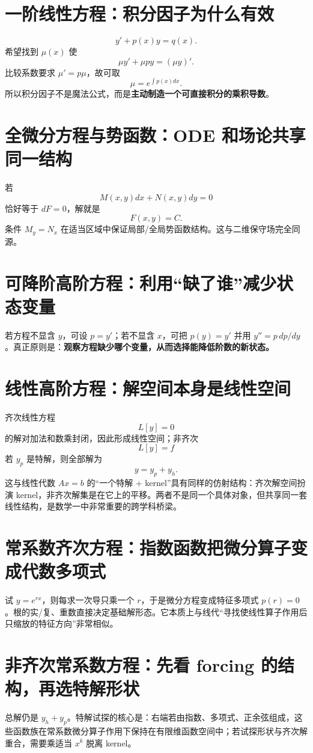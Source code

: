 \documentclass[11pt,a4paper,openany]{ctexbook}
\newcommand{\key}[1]{\textbf{\color{deep}#1}}
\begin{document}
\section{一阶线性方程：积分因子为什么有效}
\[
y'+p(x)y=q(x).
\]
希望找到 $\mu(x)$ 使
\[
\mu y'+\mu py=(\mu y)'.
\]
比较系数要求 $\mu'=p\mu$，故可取
\[
\mu=e^{\int p(x)dx}.
\]
所以积分因子不是魔法公式，而是\key{主动制造一个可直接积分的乘积导数}。

\section{全微分方程与势函数：ODE 和场论共享同一结构}
若
\[
M(x,y)dx+N(x,y)dy=0
\]
恰好等于 $dF=0$，解就是
\[
F(x,y)=C.
\]
条件 $M_y=N_x$ 在适当区域中保证局部/全局势函数结构。这与二维保守场完全同源。

\section{可降阶高阶方程：利用“缺了谁”减少状态变量}
若方程不显含 $y$，可设 $p=y'$；若不显含 $x$，可把 $p(y)=y'$ 并用 $y''=p\,dp/dy$。真正原则是：\key{观察方程缺少哪个变量，从而选择能降低阶数的新状态。}

\section{线性高阶方程：解空间本身是线性空间}
齐次线性方程
\[
L[y]=0
\]
的解对加法和数乘封闭，因此形成线性空间；非齐次
\[
L[y]=f
\]
若 $y_p$ 是特解，则全部解为
\[
\boxed{y=y_p+y_h}.
\]
这与线性代数 $Ax=b$ 的“一个特解 + kernel”具有同样的仿射结构：齐次解空间扮演 kernel，非齐次解集是在它上的平移。两者不是同一个具体对象，但共享同一套线性结构，是数学一中非常重要的跨学科桥梁。

\section{常系数齐次方程：指数函数把微分算子变成代数多项式}
试 $y=e^{rx}$，则每求一次导只乘一个 $r$，于是微分方程变成特征多项式 $p(r)=0$。根的实/复、重数直接决定基础解形态。它本质上与线代“寻找使线性算子作用后只缩放的特征方向”非常相似。

\section{非齐次常系数方程：先看 forcing 的结构，再选特解形状}
总解仍是 $y_h+y_p$。特解试探的核心是：右端若由指数、多项式、正余弦组成，这些函数族在常系数微分算子作用下保持在有限维函数空间中；若试探形状与齐次解重合，需要乘适当 $x^k$ 脱离 kernel。
\end{document}
